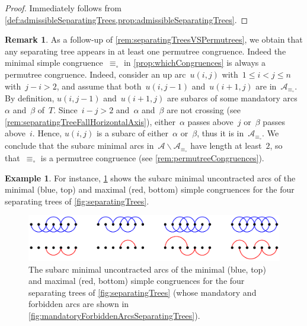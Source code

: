 \documentclass{amsart}
\theoremstyle{definition}
\newtheorem{example}[theorem]{Example}
\newtheorem{remark}[theorem]{Remark}
\newcommand{\ssm}{\smallsetminus} %
\newcommand{\arcs}{{\mathcal{A}}} %
\begin{document}
\begin{proof}
Immediately follows from \cref{def:admissibleSeparatingTrees,prop:admissibleSeparatingTrees}.
\end{proof}

\begin{remark}
\label{rem:separatingTreesArePermutrees}
As a follow-up of \cref{rem:separatingTreesVSPermutrees}, we obtain that any separating tree appears in at least one permutree congruence.
Indeed the minimal simple congruence~$\equiv_\circ$ in \cref{prop:whichCongruences} is always a permutree congruence.
Indeed, consider an up arc~$u(i, j)$ with~$1 \le i < j \le n$ with~$j-i > 2$, and assume that both~$u(i,j-1)$ and~$u(i+1,j)$ are in~$\arcs_{\equiv_\circ}$.
By definition, $u(i,j-1)$ and~$u(i+1,j)$ are subarcs of some mandatory arcs~$\alpha$ and~$\beta$ of~$T$.
Since~$i-j > 2$ and~$\alpha$ and~$\beta$ are not crossing (see \cref{rem:separatingTreeFallHorizontalAxis}), either~$\alpha$ passes above~$j$ or~$\beta$ passes above~$i$.
Hence, $u(i,j)$ is a subarc of either~$\alpha$ or~$\beta$, thus it is in~$\arcs_{\equiv_\circ}$.
We conclude that the subarc minimal arcs in~$\arcs \ssm \arcs_{\equiv_\circ}$ have length at least~$2$, so that~$\equiv_\circ$ is a permutree congruence (see \cref{rem:permutreeCongruences}).
\end{remark}

\begin{example}
For instance, \cref{fig:minMaxCongruencesSeparatingTrees} shows the subarc minimal uncontracted arcs of the minimal (blue, top) and maximal (red, bottom) simple congruences for the four separating trees of \cref{fig:separatingTrees}.
\begin{figure}
	\capstart
	\centerline{\includegraphics[scale=.85]{minMaxCongruencesSeparatingTrees}}
	\caption{The subarc minimal uncontracted arcs of the minimal (blue, top) and maximal (red, bottom) simple congruences for the four separating trees of \cref{fig:separatingTrees} (whose mandatory and forbidden arcs are shown in \cref{fig:mandatoryForbiddenArcsSeparatingTrees}).}
	\label{fig:minMaxCongruencesSeparatingTrees}
\end{figure}
\end{example}
\end{document}
